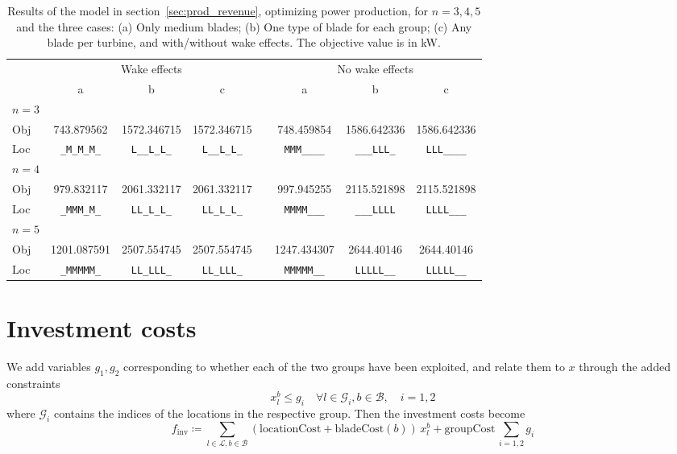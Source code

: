 \documentclass{article}
\renewcommand{\arraystretch}{1.2}
\begin{document}
\begin{table}
	\centering
	\caption{Results of the model in section~\ref{sec:prod_revenue},
	optimizing power production, for $n=3,4,5$ and the three cases:
	(a) Only medium blades;
	(b) One type of blade for each group;
	(c) Any blade per turbine,
	and with/without wake effects.
	The objective value is in \si{\kilo\watt}. \label{tab:2_res}}
	\renewcommand{\arraystretch}{1.2}
	\begin{tabular}{@{}l ccc c ccc@{}}
		\toprule
		& \multicolumn{3}{c}{Wake effects} && \multicolumn{3}{c}{No wake effects} \\
		\cmidrule{2-4} \cmidrule{6-8}
		& a & b & c && a & b & c \\ \midrule
		$n=3$ \\
		Obj & \num{743.879562} & \num{1572.346715} & \num{1572.346715} && \num{748.459854} & \num{1586.642336} & \num{1586.642336} \\
		Loc & \verb+_M_M_M_+ & \verb+L__L_L_+ & \verb+L__L_L_+ &&
		\verb+MMM____+ & \verb+___LLL_+ & \verb+LLL____+ \\

		$n=4$ \\
		Obj & \num{979.832117} & \num{2061.332117} & \num{2061.332117} && \num{997.945255} & \num{2115.521898} & \num{2115.521898} \\
		Loc & \verb+_MMM_M_+ & \verb+LL_L_L_+ & \verb+LL_L_L_+ &&
		\verb+MMMM___+ & \verb+___LLLL+ & \verb+LLLL___+ \\

		$n=5$ \\
		Obj & \num{1201.087591} & \num{2507.554745} & \num{2507.554745} && \num{1247.434307} & \num{2644.40146} & \num{2644.40146} \\
		Loc & \verb+_MMMMM_+ & \verb+LL_LLL_+ & \verb+LL_LLL_+ &&
		\verb+MMMMM__+ & \verb+LLLLL__+ & \verb+LLLLL__+ \\
		\bottomrule
	\end{tabular}
\end{table}

\section{Investment costs}
We add variables $g_1,g_2$ corresponding to whether
each of the two groups have been exploited,
and relate them to $x$ through the added constraints
$$ x_l^b \le g_i \quad \forall l \in \mathcal G_i, b \in \mathcal B, \quad i=1,2$$
where $\mathcal G_i$ contains the indices of the locations
in the respective group.
Then the investment costs become
$$ f_\text{inv} \coloneqq \sum_{l \in \mathcal L, b \in \mathcal B} (\text{locationCost} + \text{bladeCost}(b)) \, x_l^b + \text{groupCost} \, \sum_{i=1,2} g_i $$
\end{document}
